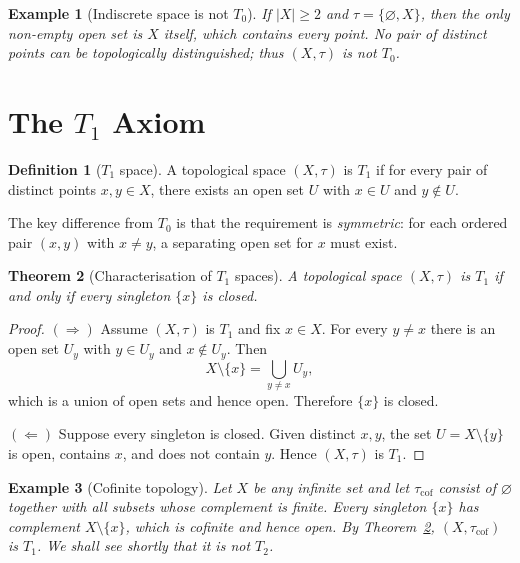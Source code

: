 \documentclass[11pt,a4paper,twoside]{book}
\newtheorem{theorem}{Theorem}[section]
\theoremstyle{remark}
\theoremstyle{definition}
\newtheorem{exampleplain}[theorem]{Example}
\theoremstyle{definition}
\newtheorem{definition}{Definition}[section]
\newenvironment{example}[1][]{%
  \begin{exampleplain}[#1]\itshape
}{%
  \end{exampleplain}
}
\begin{document}
\begin{example}[Indiscrete space is not $T_0$]\label{ex:indiscrete-not-T0}
If $|X| \ge 2$ and $\tau = \{\varnothing, X\}$, then the only non-empty open
set is $X$ itself, which contains every point.  No pair of distinct points can
be topologically distinguished; thus $(X,\tau)$ is \emph{not} $T_0$.
\end{example}

\section{The \texorpdfstring{$T_1$}{T1} Axiom}
\label{sec:T1}

\begin{definition}[$T_1$ space]\label{def:T1}
A topological space $(X,\tau)$ is \textbf{$T_1$} if for every pair of distinct
points $x, y \in X$, there exists an open set $U$ with $x \in U$ and
$y \notin U$.
\end{definition}

The key difference from $T_0$ is that the requirement is \emph{symmetric}: for
each ordered pair $(x,y)$ with $x \neq y$, a separating open set for $x$ must
exist.

\begin{theorem}[Characterisation of $T_1$ spaces]\label{thm:T1-singletons}
A topological space $(X,\tau)$ is $T_1$ if and only if every singleton
$\{x\}$ is closed.
\end{theorem}

\begin{proof}
$(\Rightarrow)$ Assume $(X,\tau)$ is $T_1$ and fix $x \in X$.  For every
$y \neq x$ there is an open set $U_y$ with $y \in U_y$ and $x \notin U_y$.
Then
\[
  X \setminus \{x\} = \bigcup_{y \neq x} U_y,
\]
which is a union of open sets and hence open.  Therefore $\{x\}$ is closed.

$(\Leftarrow)$ Suppose every singleton is closed.  Given distinct $x,y$, the
set $U = X \setminus \{y\}$ is open, contains $x$, and does not contain $y$.
Hence $(X,\tau)$ is $T_1$.
\end{proof}

\begin{example}[Cofinite topology]\label{ex:cofinite-T1}
Let $X$ be any infinite set and let $\tau_{\mathrm{cof}}$ consist of
$\varnothing$ together with all subsets whose complement is finite.  Every
singleton $\{x\}$ has complement $X \setminus \{x\}$, which is cofinite and
hence open.  By Theorem~\ref{thm:T1-singletons}, $(X,\tau_{\mathrm{cof}})$ is
$T_1$.  We shall see shortly that it is \emph{not} $T_2$.
\end{example}
\end{document}
